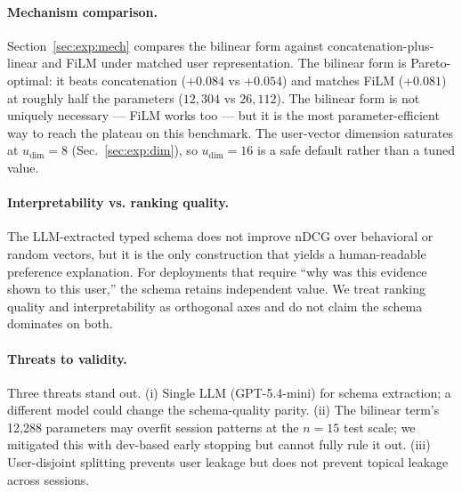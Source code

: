 \paragraph{Mechanism comparison.}
Section~\ref{sec:exp:mech} compares the bilinear form against concatenation-plus-linear and FiLM under matched user representation. The bilinear form is Pareto-optimal: it beats concatenation ($+0.084$ vs $+0.054$) and matches FiLM ($+0.081$) at roughly half the parameters ($12{,}304$ vs $26{,}112$). The bilinear form is not uniquely necessary --- FiLM works too --- but it is the most parameter-efficient way to reach the plateau on this benchmark. The user-vector dimension saturates at $u_{\dim}{=}8$ (Sec.~\ref{sec:exp:dim}), so $u_{\dim}{=}16$ is a safe default rather than a tuned value.

\paragraph{Interpretability vs. ranking quality.}
The LLM-extracted typed schema does not improve nDCG over behavioral or random vectors, but it is the only construction that yields a human-readable preference explanation. For deployments that require ``why was this evidence shown to this user,'' the schema retains independent value. We treat ranking quality and interpretability as orthogonal axes and do not claim the schema dominates on both.

\paragraph{Threats to validity.}
Three threats stand out. (i) Single LLM (GPT-5.4-mini) for schema extraction; a different model could change the schema-quality parity. (ii) The bilinear term's 12{,}288 parameters may overfit session patterns at the $n=15$ test scale; we mitigated this with dev-based early stopping but cannot fully rule it out. (iii) User-disjoint splitting prevents user leakage but does not prevent topical leakage across sessions.
